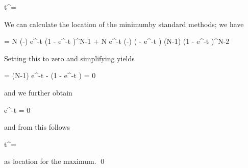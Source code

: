 \bee
t^\star = 
\eee

We can calculate the location of the minimumby standard methods; we have

\bee
{} = \lambda N (-\lambda) e^{-\lambda t} \left(1 - e^{-\lambda t} \right)^{N-1} + \lambda N e^{-\lambda t} (-\lambda) \left( - e^{-\lambda t} \right) (N-1) \left(1 - e^{-\lambda t} \right)^{N-2}
\eee

Setting this to zero and simplifying yields

\bee
{} = (N-1) e^{-\lambda t} - \left(1 - e^{-\lambda t} \right) = 0
\eee

and we further obtain

\bee
e^{-\lambda t}  = 0
\eee

and from this follows

\bee
t^\star = 
\eee

as location for the maximum. \qed

